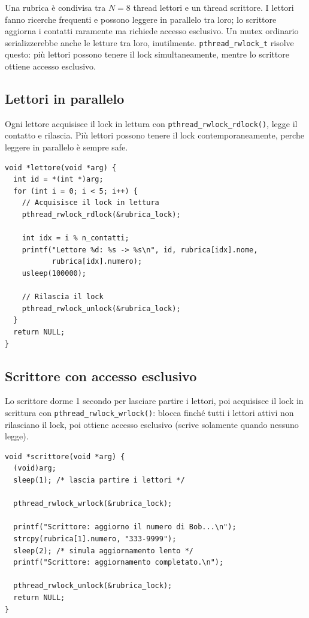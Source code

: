\documentclass[a4paper,12pt]{article}
\begin{document}
Una rubrica è condivisa tra $N = 8$ thread lettori e un thread scrittore.
I lettori fanno ricerche frequenti e possono leggere in parallelo tra loro;
lo scrittore aggiorna i contatti raramente ma richiede accesso esclusivo.
Un mutex ordinario serializzerebbe anche le letture tra loro, inutilmente.
\texttt{pthread\_rwlock\_t} risolve questo: più lettori possono tenere il
lock simultaneamente, mentre lo scrittore ottiene accesso esclusivo.

\subsection*{Lettori in parallelo}

Ogni lettore acquisisce il lock in lettura con
\texttt{pthread\_rwlock\_rdlock()}, legge il contatto e rilascia.
Più lettori possono tenere il lock contemporaneamente, perche leggere
in parallelo è sempre safe.

\begin{lstlisting}[caption={Thread lettore}]
void *lettore(void *arg) {
  int id = *(int *)arg;
  for (int i = 0; i < 5; i++) {
    // Acquisisce il lock in lettura
    pthread_rwlock_rdlock(&rubrica_lock);

    int idx = i % n_contatti;
    printf("Lettore %d: %s -> %s\n", id, rubrica[idx].nome,
           rubrica[idx].numero);
    usleep(100000);

    // Rilascia il lock
    pthread_rwlock_unlock(&rubrica_lock);
  }
  return NULL;
}
\end{lstlisting}

\subsection*{Scrittore con accesso esclusivo}

Lo scrittore dorme 1 secondo per lasciare partire i lettori, poi acquisisce
il lock in scrittura con \texttt{pthread\_rwlock\_wrlock()}: blocca finché
tutti i lettori attivi non rilasciano il lock, poi ottiene accesso esclusivo 
(scrive solamente quando nessuno legge).

\begin{lstlisting}[caption={Thread scrittore}]
void *scrittore(void *arg) {
  (void)arg;
  sleep(1); /* lascia partire i lettori */

  pthread_rwlock_wrlock(&rubrica_lock);

  printf("Scrittore: aggiorno il numero di Bob...\n");
  strcpy(rubrica[1].numero, "333-9999");
  sleep(2); /* simula aggiornamento lento */
  printf("Scrittore: aggiornamento completato.\n");

  pthread_rwlock_unlock(&rubrica_lock);
  return NULL;
}
\end{lstlisting}
\end{document}

